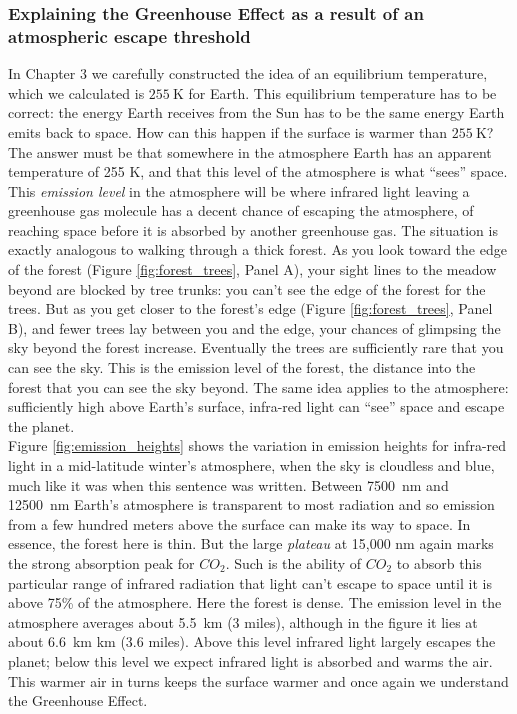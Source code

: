 \subsubsection{Explaining the Greenhouse Effect as a result of an atmospheric escape threshold}
In Chapter 3 we carefully constructed the idea of an equilibrium temperature, which we calculated is $\SI{255}{\kelvin}$ for Earth. This equilibrium temperature has to be correct: the energy Earth receives from the Sun has to be the same energy Earth emits back to space. How can this happen if the surface is warmer than $\SI{255}{\kelvin}$? The answer must be that somewhere in the atmosphere Earth has an apparent temperature of 255 K, and that this level of the atmosphere is what ``sees'' space. This \emph{emission level} in the atmosphere will be where infrared light leaving a greenhouse gas molecule has a decent chance of escaping the atmosphere, of reaching space before it is absorbed by another greenhouse gas. The situation is exactly analogous to walking through a thick forest. As you look toward the edge of the forest (Figure \ref{fig:forest_trees}, Panel A), your sight lines to the meadow beyond are blocked by tree trunks: you can't see the edge of the forest for the trees. But as you get closer to the forest's edge (Figure \ref{fig:forest_trees}, Panel B), and fewer trees lay between you and the edge, your chances of glimpsing the sky beyond the forest increase. Eventually the trees are sufficiently rare that you can see the sky. This is the emission level of the forest, the distance into the forest that you can see the sky beyond. The same idea applies to the atmosphere: sufficiently high above Earth's surface, infra-red light can ``see'' space and escape the planet.\\

Figure \ref{fig:emission_heights} shows the variation in emission heights for infra-red light in a mid-latitude winter's atmosphere, when the sky is cloudless and blue, much like it was when this sentence was written. Between \SI{7500}{\nano\metre} and \SI{12500}{\nano\metre} Earth's atmosphere is transparent to most radiation and so emission from a few hundred meters above the surface can make its way to space. In essence, the forest here is thin. But the large \textit{plateau} at 15,000 nm again marks the strong absorption peak for $CO_2$. Such is the ability of $CO_2$ to absorb this particular range of infrared radiation that light can't escape to space until it is above 75\% of the atmosphere. Here the forest is dense. The emission level in the atmosphere averages about \SI{5.5}{\kilo\metre} (3 miles), although in the figure it lies at about \SI{6.6}{\kilo\metre} km (3.6 miles). Above this level infrared light largely escapes the planet; below this level we expect infrared light is absorbed and warms the air. This warmer air in turns keeps the surface warmer and once again we understand the Greenhouse Effect. 

